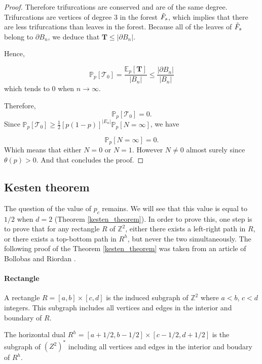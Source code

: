 \documentclass[a4paper,11pt]{article}
\theoremstyle{plain}
\theoremstyle{definition}
\theoremstyle{remark}
\begin{document}
\begin{proof}
Therefore trifurcations are conserved and are of the same degree. Trifurcations are vertices of degree $3$ in the forest $\Tilde{F}_s$, which implies that there are less trifurcations than leaves in the forest. Because all of the leaves of $\Tilde{F}_{s}$ belong to $\partial B_n$, we deduce that $\mathbf{T} \leq |\partial B_n|$.

Hence,

\[ \mathbb{P}_p[\mathscr{T}_0] = \frac{\mathbb{E}_p[\mathbf{T}]}{|B_n|} \leq \frac{|\partial B_n|}{|B_n|}\]
which tends to $0$ when $n \longrightarrow \infty$.

Therefore,
\[ \mathbb{P}_p[\mathscr{T}_0] = 0. \]
Since $\mathbb{P}_p[\mathscr{T}_0] \geq \frac{1}{2}[p (1 - p)]^{|E_n|}\mathbb{P}_p[N = \infty]$, we have

\[ \mathbb{P}_p[N = \infty] = 0. \]
Which means that either $N = 0$ or $N = 1$. However $N \not= 0$ almost surely since $\theta(p) > 0$. And that concludes the proof.
\end{proof}

\subsection{Kesten theorem}
The question of the value of $p_c$ remains. We will see that this value is equal to $1/2$ when
$d = 2$ (Theorem \ref{kesten_theorem}). In order to prove this, one step is to prove that for any rectangle $R$ of $\mathbb{Z}^2$, either there exists a left-right path in $R$, or there exists a top-bottom path in $R^h$, but never the two simultaneously. The following proof of the Theorem \ref{kesten_theorem} was taken from an article of Bollobas and Riordan \cite{bollobas}.

\paragraph{Rectangle}
A rectangle $R = [a, b] \times [c,d]$ is the induced subgraph of $\mathbb{Z}^2$ where $a < b$, $c < d$ integers. This subgraph includes all vertices and edges in the interior and boundary of $R$.

The horizontal dual $R^h = [a + 1/2, b - 1/2] \times [c - 1/2,d + 1/2]$ is the subgraph of $(Z^2)^*$ including all vertices and edges in the interior and boudary of $R^h$.
\end{document}
